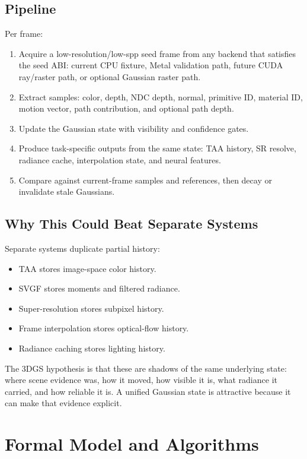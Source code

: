 \documentclass[11pt]{article}
\begin{document}
\subsection{Pipeline}

Per frame:

\begin{enumerate}
  \item Acquire a low-resolution/low-spp seed frame from any backend that
        satisfies the seed ABI: current CPU fixture, Metal validation path,
        future CUDA ray/raster path, or optional Gaussian raster path.
  \item Extract samples: color, depth, NDC depth, normal, primitive ID,
        material ID, motion vector, path contribution, and optional path depth.
  \item Update the Gaussian state with visibility and confidence gates.
  \item Produce task-specific outputs from the same state:
        TAA history, SR resolve, radiance cache, interpolation state, and
        neural features.
  \item Compare against current-frame samples and references, then decay or
        invalidate stale Gaussians.
\end{enumerate}

\subsection{Why This Could Beat Separate Systems}

Separate systems duplicate partial history:

\begin{itemize}
  \item TAA stores image-space color history.
  \item SVGF stores moments and filtered radiance.
  \item Super-resolution stores subpixel history.
  \item Frame interpolation stores optical-flow history.
  \item Radiance caching stores lighting history.
\end{itemize}

The 3DGS hypothesis is that these are shadows of the same underlying state:
where scene evidence was, how it moved, how visible it is, what radiance it
carried, and how reliable it is. A unified Gaussian state is attractive because
it can make that evidence explicit.

\section{Formal Model and Algorithms}
\end{document}
